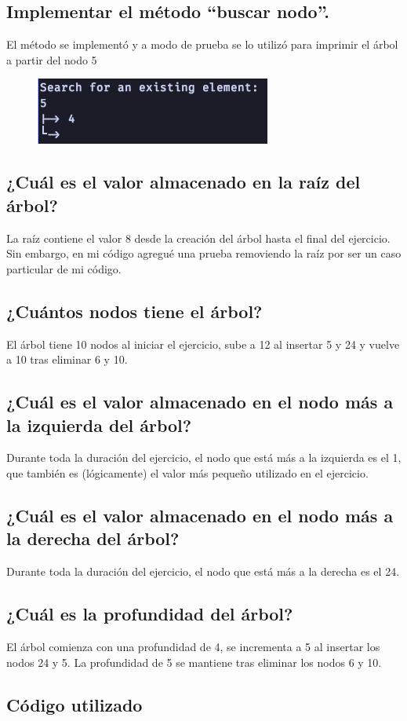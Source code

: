 \documentclass[a4paper,notitlepage]{article}
\begin{document}
\subsection{Implementar el método “buscar nodo”.}

El método se implementó y a modo de prueba se lo utilizó para imprimir el árbol
a partir del nodo 5

\begin{figure}[H]
    \centering
    \includegraphics[scale=0.65]{imgs/search.png}
\end{figure}

\subsection{¿Cuál es el valor almacenado en la raíz del árbol?}
La raíz contiene el valor 8 desde la creación del árbol hasta el final del
ejercicio. Sin embargo, en mi código agregué una prueba removiendo la raíz
por ser un caso particular de mi código.

\subsection{¿Cuántos nodos tiene el árbol?}
El árbol tiene 10 nodos al iniciar el ejercicio, sube a 12 al
insertar 5 y 24 y vuelve a 10 tras eliminar 6 y 10.

\subsection{¿Cuál es el valor almacenado en el nodo más a la izquierda del árbol?}
Durante toda la duración del ejercicio, el nodo que está más a la izquierda es
el 1, que también es (lógicamente) el valor más pequeño utilizado en el
ejercicio.

\subsection{¿Cuál es el valor almacenado en el nodo más a la derecha del árbol?}
Durante toda la duración del ejercicio, el nodo que está más a la derecha es
el 24.

\subsection{¿Cuál es la profundidad del árbol?}
El árbol comienza con una profundidad de 4, se incrementa a 5 al insertar los
nodos 24 y 5. La profundidad de 5 se mantiene tras eliminar los nodos 6 y 10.

\begin{appendix}
    \section{Código utilizado}
    
\end{appendix}
\end{document}
